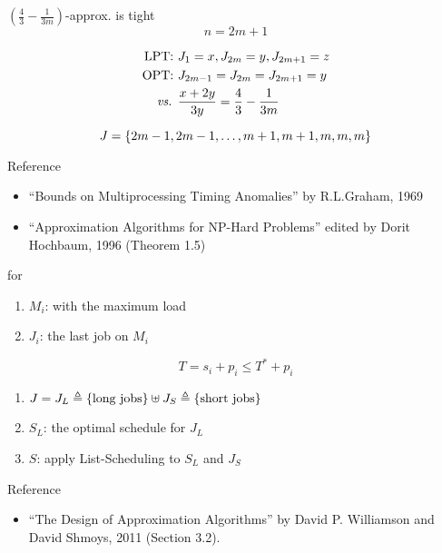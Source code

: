 \begin{frame}{$(\frac{4}{3} - \frac{1}{3m})$-approx. is tight}
  \[
	n = 2m + 1
  \]

  \begin{align*}
	\text{LPT: } &J_1 = x, J_{2m} = y, J_{2m+1} = z \\
	\text{OPT: } &J_{2m-1} = J_{2m} = J_{2m+1} = y \\
	\text{\it vs. } &\frac{x + 2y}{3y} = \frac{4}{3} - \frac{1}{3m}
  \end{align*}

  \[
	J = \left\{ 2m-1,2m-1,\dots,m+1,m+1,m,m,m \right\}
  \]

  \begin{alertblock}{Reference}
	\begin{itemize}
	  \item ``Bounds on Multiprocessing Timing Anomalies'' by R.L.Graham, 1969
	  \item ``Approximation Algorithms for NP-Hard Problems'' edited by Dorit Hochbaum, 1996 ({\small Theorem 1.5})
	\end{itemize}
  \end{alertblock}
\end{frame}
\begin{frame}{\ptas{} for \ms{}}
  \begin{enumerate}
	\item $M_i$: with the maximum load
	\item $J_i$: the last job on $M_i$
  \end{enumerate}

  \[
	T = s_i + p_i \le T^{\ast} + p_i
  \]

  \begin{enumerate}
	\item $J = J_{L} \triangleq \left\{ \text{long jobs} \right\} \uplus J_{S} \triangleq \left\{ \text{short jobs} \right\}$
	\item $S_L$: the optimal schedule for $J_L$
	\item $S$: apply List-Scheduling to $S_L$ and $J_S$
  \end{enumerate}

  \begin{alertblock}{Reference}
	\begin{itemize}
	  \item ``The Design of Approximation Algorithms'' by David P. Williamson and David Shmoys, 2011 ({\small Section 3.2}).
	\end{itemize}
  \end{alertblock}
\end{frame}
